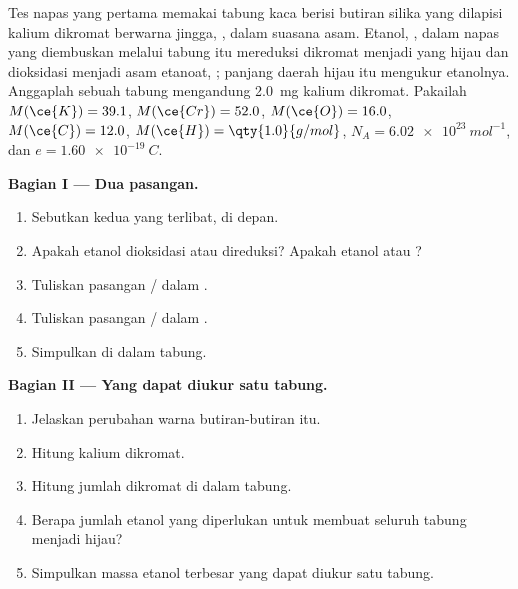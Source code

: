 \begin{problem}
\label{pb:g11:redox:1}
Tes  napas yang pertama memakai tabung kaca berisi butiran silika
yang dilapisi kalium dikromat berwarna jingga, , dalam
suasana asam. Etanol, , dalam napas yang diembuskan melalui
tabung itu mereduksi  dikromat menjadi   yang hijau
dan dioksidasi menjadi asam etanoat, ; panjang daerah hijau
itu mengukur etanolnya. Anggaplah sebuah tabung mengandung
\qty{2.0}{mg} kalium dikromat. Pakailah
$M(\ce{K}) = 39.1$, $M(\ce{Cr}) = 52.0$, $M(\ce{O}) = 16.0$,
$M(\ce{C}) = 12.0$, $M(\ce{H}) = \qty{1.0}{g/mol}$, $N_A =
\qty{6.02e23}{mol^{-1}}$, dan $e = \qty{1.60e-19}{C}$.

\medskip
\noindent\textbf{Bagian I --- Dua pasangan.}
\begin{enumerate}
  \item Sebutkan kedua  yang terlibat,  di depan.
  \item Apakah etanol dioksidasi atau direduksi? Apakah etanol
         atau ?
  \item Tuliskan  pasangan /
        dalam .
  \item Tuliskan  pasangan /
        dalam .
  \item Simpulkan  di dalam tabung.
\end{enumerate}

\medskip
\noindent\textbf{Bagian II --- Yang dapat diukur satu tabung.}
\begin{enumerate}[resume]
  \item Jelaskan perubahan warna butiran-butiran itu.
  \item Hitung  kalium dikromat.
  \item Hitung jumlah  dikromat di dalam tabung.
  \item Berapa jumlah etanol yang diperlukan untuk membuat seluruh tabung
        menjadi hijau?
  \item Simpulkan massa etanol terbesar yang dapat diukur satu tabung.
\end{enumerate}


\end{problem}
